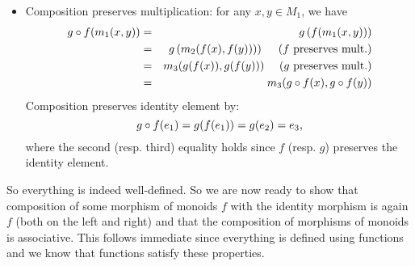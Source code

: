 \begin{solution}
\begin{itemize}
\begin{itemize}
\item Composition preserves multiplication: for any $x,y \in M_1$, we have
\begin{eqnarray*}
 \co{f}{g}(m_1(x,y)) &=& g\left(f(m_1(x,y))\right)\\ 
	&=& g\left(m_2(f(x),f(y)))\right) \quad \text{ ($f$ preserves mult.)} \\
	&=& m_3(g(f(x)),g(f(y))) \quad \text{ ($g$ preserves mult.)}\\
	&=& m_3(\co{f}{g}(x),\co{f}{g}(y))
\end{eqnarray*}
Composition preserves identity element by:
\[
\co{f}{g}(e_1) = g(f(e_1)) = g(e_2) = e_3,
\]
where the second (resp. third) equality holds since $f$ (resp. $g$) preserves the identity element.
\end{itemize}
\end{itemize}
So everything is indeed well-defined. So we are now ready to show that composition of some morphism of monoids $f$ with the identity morphism is again $f$ (both on the left and right) and that the composition of morphisms of monoids is associative. This follows immediate since everything is defined using functions and we know that functions satisfy these properties.
\end{solution}

